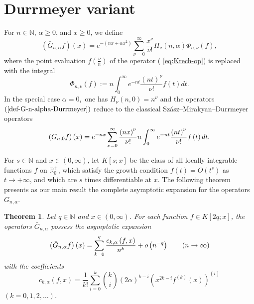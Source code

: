 \documentclass[11pt,a4paper]{article}
\newtheorem{theorem}{Theorem}
\begin{document}
\section{Durrmeyer variant}

For $n\in \mathbb{N}$, $\alpha \geq 0$, and $x\geq 0$, we define 
\begin{equation}
\left( \bar{G}_{n,\alpha }f\right) \left( x\right) =e^{-\left( nx+\alpha
x^{2}\right) }\sum_{\nu =0}^{\infty }\frac{x^{\nu }}{\nu !}H_{\nu }\left(
n,\alpha \right) \Phi _{n,\nu }\left( f\right) ,
\label{def-G-n-alpha-Durrmeyer}
\end{equation}%
where the point evaluation $f\left( \frac{\nu }{n}\right) $ of the operator (%
\ref{eq:Krech-op}) is replaced with the integral 
\begin{equation*}
\Phi _{n,\nu }\left( f\right) :=n\int_{0}^{\infty }e^{-nt}\frac{\left(
nt\right) ^{\nu }}{\nu !}f\left( t\right) dt.
\end{equation*}%
In the special case $\alpha =0$,\ one has $H_{\nu }\left( n,0\right) =n^{\nu
}$ and the operators $\left( \ref{def-G-n-alpha-Durrmeyer}\right) $ reduce
to the classical Sz\'{a}sz--Mirakyan--Durrmeyer operators 
\begin{equation*}
\left( G_{n,0}f\right) \left( x\right) =e^{-nx}\sum_{\nu =0}^{\infty }\frac{%
\left( nx\right) ^{\nu }}{\nu !}n\int_{0}^{\infty }e^{-nt}\frac{\left(
nt\right) ^{\nu }}{\nu !}f\left( t\right) dt.
\end{equation*}

For $s\in \mathbb{N}$ and $x\in \left( 0,\infty \right) $, let $K\left[ s;x%
\right] $ be the class of all locally integrable functions $f$ on $\mathbb{R}%
_{0}^{+}$, which satisfy the growth condition $f\left( t\right) =O\left(
t^{s}\right) $ as $t\rightarrow +\infty $, and which are $s$ times
differentiable at $x$. The following theorem presents as our main result the
complete asymptotic expansion for the operators $G_{n,\alpha }$.

\begin{theorem}
\label{theorem-expansion}Let $q\in \mathbb{N}$ and $x\in \left( 0,\infty
\right) $. For each function $f\in K\left[ 2q;x\right] $, the operators $%
\bar{G}_{n,\alpha }$ possess the asymptotic expansion 
\begin{equation}
\left( \bar{G}_{n,\alpha }f\right) \left( x\right) =\sum_{k=0}^{q}\frac{%
c_{k,\alpha }\left( f,x\right) }{n^{k}}+o\left( n^{-q}\right) \qquad \left(
n\rightarrow \infty \right)  \label{complete-asympt-expansion-in-theorem}
\end{equation}%
with the coefficients 
\begin{equation}
c_{k,\alpha }\left( f,x\right) =\frac{1}{k!}\sum_{i=0}^{k}\binom{k}{i}\left(
2\alpha \right) ^{k-i}\left( x^{2k-i}f^{\left( k\right) }\left( x\right)
\right) ^{\left( i\right) }  \label{coeff-c}
\end{equation}%
$\left( k=0,1,2,\ldots \right) $.
\end{theorem}
\end{document}
